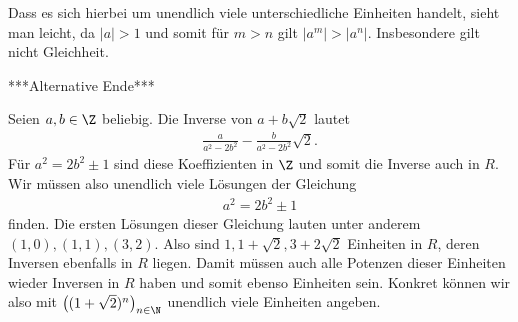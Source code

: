 \begin{solution}
\begin{itemize}
  Dass es sich hierbei um unendlich viele unterschiedliche Einheiten handelt, sieht man leicht, da $|a|>1$ und somit für $m>n$ gilt $|a^m|>|a^n|$. Insbesondere gilt nicht Gleichheit.

  ***Alternative Ende***


  Seien $a,b \in \Z$ beliebig. Die Inverse von $a + b\sqrt{2}$ lautet
  \begin{align*}
    \frac{a}{a^2 - 2b^2} - \frac{b}{a^2-2b^2}\sqrt{2}.
  \end{align*}
  Für $a^2 = 2b^2 \pm 1$ sind diese Koeffizienten in $\Z$ und somit die Inverse
  auch in $R$. Wir müssen also unendlich viele Lösungen der Gleichung
  \begin{align*}
    a^2 = 2b^2 \pm 1
  \end{align*}
  finden. Die ersten Lösungen dieser Gleichung lauten unter anderem $(1,0),(1,1),(3,2)$.
  Also sind $1, 1 + \sqrt{2}, 3 + 2\sqrt{2}$ Einheiten in $R$, deren Inversen ebenfalls in $R$
  liegen. Damit müssen auch alle Potenzen dieser Einheiten wieder Inversen in $R$ haben
  und somit ebenso Einheiten sein. Konkret können wir also mit $\left((1 + \sqrt{2})^n\right)_{n \in \N}$
  unendlich viele Einheiten angeben.
\end{itemize}

\end{solution}
